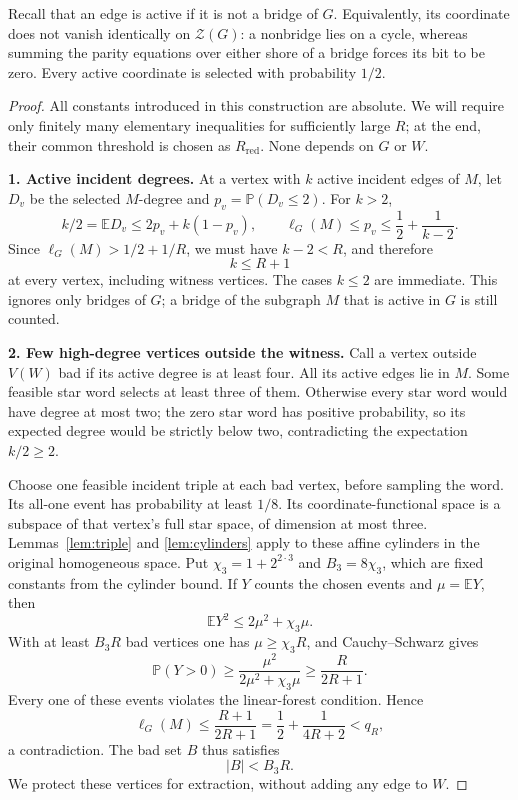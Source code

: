 \documentclass[11pt,a4paper]{article}
\numberwithin{equation}{section}
\theoremstyle{definition}
\theoremstyle{remark}
\newcommand{\cZ}{\mathcal Z}
\newcommand{\E}{\mathbb E}
\newcommand{\Prob}{\mathbb P}
\newcommand{\proofstep}[1]{\par\addvspace{\medskipamount}\noindent\textbf{#1}\enspace\ignorespaces}
\begin{document}
Recall that an edge is active if it is not a bridge of $G$. Equivalently, its coordinate does not vanish identically on $\cZ(G)$: a nonbridge lies on a cycle, whereas summing the parity equations over either shore of a bridge forces its bit to be zero. Every active coordinate is selected with probability $1/2$.

\begin{proof}
All constants introduced in this construction are absolute. We will require only finitely many elementary inequalities for sufficiently large $R$; at the end, their common threshold is chosen as $R_{\mathrm{red}}$. None depends on $G$ or $W$.

\proofstep{1. Active incident degrees.}
At a vertex with $k$ active incident edges of $M$, let $D_v$ be the selected $M$-degree and $p_v=\Prob(D_v\le2)$. For $k>2$,
\[
 k/2=\E D_v\le2p_v+k(1-p_v),
 \qquad
 \ell_G(M)\le p_v\le\frac12+\frac1{k-2}.
\]
Since $\ell_G(M)>1/2+1/R$, we must have $k-2<R$, and therefore
\begin{equation}\label{eq:active-degree}
 k\le R+1
\end{equation}
at every vertex, including witness vertices. The cases $k\le2$ are immediate. This ignores only bridges of $G$; a bridge of the subgraph $M$ that is active in $G$ is still counted.

\proofstep{2. Few high-degree vertices outside the witness.}
Call a vertex outside $V(W)$ bad if its active degree is at least four. All its active edges lie in $M$. Some feasible star word selects at least three of them. Otherwise every star word would have degree at most two; the zero star word has positive probability, so its expected degree would be strictly below two, contradicting the expectation $k/2\ge2$.

Choose one feasible incident triple at each bad vertex, before sampling the word. Its all-one event has probability at least $1/8$. Its coordinate-functional space is a subspace of that vertex's full star space, of dimension at most three. Lemmas~\ref{lem:triple} and \ref{lem:cylinders} apply to these affine cylinders in the original homogeneous space. Put $\chi_3=1+2^{2\cdot3}$ and $B_3=8\chi_3$, which are fixed constants from the cylinder bound. If $Y$ counts the chosen events and $\mu=\E Y$, then
\[
 \E Y^2\le2\mu^2+\chi_3\mu.
\]
With at least $B_3R$ bad vertices one has $\mu\ge \chi_3R$, and Cauchy--Schwarz gives
\[
 \Prob(Y>0)\ge\frac{\mu^2}{2\mu^2+\chi_3\mu}\ge\frac{R}{2R+1}.
\]
Every one of these events violates the linear-forest condition. Hence
\[
 \ell_G(M)\le\frac{R+1}{2R+1}
       =\frac12+\frac1{4R+2}<q_R,
\]
a contradiction. The bad set $B$ thus satisfies
\begin{equation}\label{eq:bad-count}
 |B|<B_3R.
\end{equation}
We protect these vertices for extraction, without adding any edge to $W$.


\end{proof}
\end{document}
